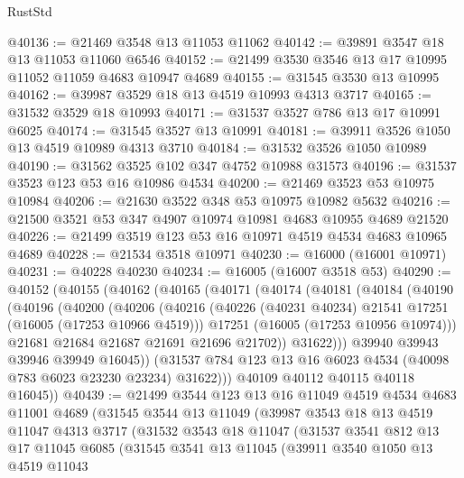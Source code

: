 \begin{lexlean}{RustStd}
\begin{coremodule}
@40136 := @21469 @3548 @13 @11053 @11062
@40142 := @39891 @3547 @18 @13 @11053 @11060 @6546
@40152 := @21499 @3530 @3546 @13 @17 @10995 @11052 @11059 @4683 @10947 @4689
@40155 := @31545 @3530 @13 @10995
@40162 := @39987 @3529 @18 @13 @4519 @10993 @4313 @3717
@40165 := @31532 @3529 @18 @10993
@40171 := @31537 @3527 @786 @13 @17 @10991 @6025
@40174 := @31545 @3527 @13 @10991
@40181 := @39911 @3526 @1050 @13 @4519 @10989 @4313 @3710
@40184 := @31532 @3526 @1050 @10989
@40190 := @31562 @3525 @102 @347 @4752 @10988 @31573
@40196 := @31537 @3523 @123 @53 @16 @10986 @4534
@40200 := @21469 @3523 @53 @10975 @10984
@40206 := @21630 @3522 @348 @53 @10975 @10982 @5632
@40216 := @21500 @3521 @53 @347 @4907 @10974 @10981 @4683 @10955 @4689 @21520
@40226 := @21499 @3519 @123 @53 @16 @10971 @4519 @4534 @4683 @10965 @4689
@40228 := @21534 @3518 @10971
@40230 := @16000 (@16001 @10971)
@40231 := @40228 @40230
@40234 := @16005 (@16007 @3518 @53)
@40290 := @40152
    (@40155
      (@40162
        (@40165
          (@40171
            (@40174
              (@40181
                (@40184
                  (@40190
                    (@40196
                      (@40200
                        (@40206
                          (@40216
                            (@40226 (@40231 @40234) @21541 @17251 (@16005 (@17253 @10966 @4519)))
                            @17251
                            (@16005 (@17253 @10956 @10974)))
                          @21681
                          @21684
                          @21687
                          @21691
                          @21696
                          @21702))
                      @31622)))
                @39940
                @39943
                @39946
                @39949
                @16045))
            (@31537 @784 @123 @13 @16 @6023 @4534 (@40098 @783 @6023 @23230 @23234) @31622)))
        @40109
        @40112
        @40115
        @40118
        @16045))
@40439 := @21499
    @3544
    @123
    @13
    @16
    @11049
    @4519
    @4534
    @4683
    @11001
    @4689
    (@31545
      @3544
      @13
      @11049
      (@39987
        @3543
        @18
        @13
        @4519
        @11047
        @4313
        @3717
        (@31532
          @3543
          @18
          @11047
          (@31537
            @3541
            @812
            @13
            @17
            @11045
            @6085
            (@31545
              @3541
              @13
              @11045
              (@39911
                @3540
                @1050
                @13
                @4519
                @11043

\end{coremodule}
\end{lexlean}
